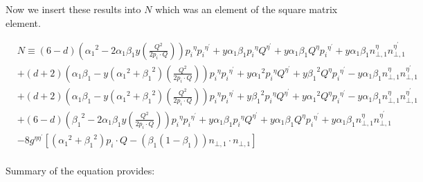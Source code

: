 Now we insert these results into $ N $ which was an element of the square matrix element.

\begin{equation}
\begin{split}
&N\equiv(6-d)({\alpha_1}^2 -2\alpha_1 \beta_1 y(\frac{Q^2}{2 p_i \cdot Q})){p_i}^{{\eta}}{p_i}^{{\eta}^{\prime}}+y\alpha_1 \beta_1 {p_i}^{{\eta}}{Q}^{{\eta}^{\prime}}+y\alpha_1 \beta_1 {Q}^{{\eta}}{p_i}^{{\eta}^{\prime}}+y\alpha_1\beta_1 {n}^{{\eta}}_{\bot,1}{n}^{{\eta}^{\prime}}_{\bot,1}\\
&+(d+2)({\alpha_1}\beta_1 -y({\alpha_1}^2 + {\beta_1}^2 )(\frac{Q^2}{2 p_i \cdot Q})){p_i}^{{\eta}}{p_i}^{{\eta}^{\prime}}+y{\alpha_1}^2 {p_i}^{{\eta}}{Q}^{{\eta}^{\prime}}+y{\beta_1}^2 {Q}^{{\eta}}{p_i}^{{\eta}^{\prime}}-y\alpha_1\beta_1 {n}^{{\eta}}_{\bot,1}{n}^{{\eta}^{\prime}}_{\bot,1}\\
&+(d+2)({\alpha_1}\beta_1 -y({\alpha_1}^2 + {\beta_1}^2 )(\frac{Q^2}{2 p_i \cdot Q})){p_i}^{{\eta}}{p_i}^{{\eta}^{\prime}}+y{\beta_1}^2 {p_i}^{{\eta}}{Q}^{{\eta}^{\prime}}+y{\alpha_1}^2 {Q}^{{\eta}}{p_i}^{{\eta}^{\prime}}-y\alpha_1\beta_1 {n}^{{\eta}}_{\bot,1}{n}^{{\eta}^{\prime}}_{\bot,1}\\
&+(6-d)({\beta_1}^2 -2\alpha_1 \beta_1 y(\frac{Q^2}{2 p_i \cdot Q})){p_i}^{{\eta}}{p_i}^{{\eta}^{\prime}}+y\alpha_1 \beta_1 {p_i}^{{\eta}}{Q}^{{\eta}^{\prime}}+y\alpha_1 \beta_1 {Q}^{{\eta}}{p_i}^{{\eta}^{\prime}}+y\alpha_1\beta_1 {n}^{{\eta}}_{\bot,1}{n}^{{\eta}^{\prime}}_{\bot,1}\\
&-8g^{{\eta}{{\eta}^{\prime}}}[({\alpha_1}^2+{\beta_1}^2) p_i \cdot Q - ({\beta_1}(1-\beta_1)){n}_{\bot,1}\cdot{n}_{\bot,1}]\\
\end{split}
\end{equation}

Summary of the equation provides:

